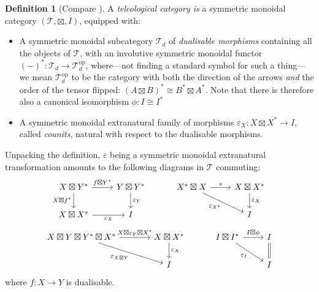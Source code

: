 \documentclass[11pt,letterpaper]{article}
\theoremstyle{plain}
\theoremstyle{definition}
\newtheorem{definition}[theorem]{Definition}
\newcommand{\T}{\mathscr{T}}
\newcommand{\op}{\mathrm{op}}
\newcommand{\teletimes}{\mathbin{\boxtimes}}
\begin{document}
\begin{definition}[Compare {\cite[Definition 5.1]{CoherenceForLenses}}]
  A \emph{teleological category is} a symmetric monoidal category $(\T, \teletimes, I)$, equipped with:
  \begin{itemize}
  \item A symmetric monoidal subcategory $\T_d$ of \emph{dualisable morphisms} containing all the objects of $\T$, with an involutive symmetric monoidal functor ${(-)}^* : \T_d \to \T_d^\op$, where---not finding a standard symbol for such a thing---we mean $\T_d^\op$ to be the category with both the direction of the arrows \emph{and} the order of the tensor flipped: ${(A \teletimes B)}^* \cong B^* \teletimes A^*$. Note that there is therefore also a canonical isomorphism $\phi : I \cong I^*$
  \item A symmetric monoidal extranatural family of morphisms $\varepsilon_X : X \teletimes X^* \to I$, called \emph{counits}, natural with respect to the dualisable morphisms.
  \end{itemize}
\end{definition}
Unpacking the definition, $\varepsilon$ being a symmetric monoidal extranatural transformation amounts to the following diagrams in $\T$ commuting:
\[
  \begin{tikzcd}
    X \teletimes Y^* \ar[r, "f \teletimes Y^*"]  \ar[d, "X \teletimes f^*", swap] & Y \teletimes Y^* \ar[d, "\varepsilon_Y"] \\
    X \teletimes X^* \ar[r, "\varepsilon_X", swap] & I
  \end{tikzcd} \hspace{1cm}
  \begin{tikzcd}
    X^* \teletimes X \ar[r, "s"]  \ar[dr, "\varepsilon_{X^*}", swap] & X \teletimes X^* \ar[d, "\varepsilon_X"] \\
    & I
  \end{tikzcd}\]
\[
  \begin{tikzcd}[column sep = large]
    X \teletimes Y \teletimes Y^* \teletimes X^* \ar[r, "X \teletimes \varepsilon_Y \teletimes X^*"]  \ar[dr, "\varepsilon_{X \teletimes Y}", swap] & X \teletimes X^* \ar[d, "\varepsilon_X"] \\
    & I
  \end{tikzcd} \hspace{1cm}
  \begin{tikzcd}
    I \teletimes I^* \ar[r,"I \teletimes \phi"] \ar[dr, swap, "\varepsilon_I"] & I \ar[d, equal] \\
    & I
  \end{tikzcd}
\]
where $f : X \to Y$ is dualisable.
\end{document}
